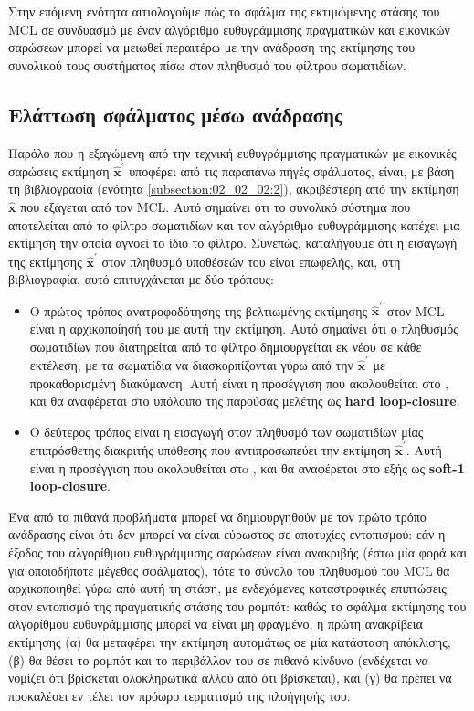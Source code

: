 Στην επόμενη ενότητα αιτιολογούμε πώς το σφάλμα της εκτιμώμενης στάσης
του MCL σε συνδυασμό με έναν αλγόριθμο ευθυγράμμισης πραγματικών και εικονικών
σαρώσεων μπορεί να μειωθεί περαιτέρω με την ανάδραση της εκτίμησης του
συνολικού τους συστήματος πίσω στον πληθυσμό του φίλτρου σωματιδίων.


\subsection{Ελάττωση σφάλματος μέσω ανάδρασης}
\label{subsection:02_02_03:03}

Παρόλο που η εξαγώμενη από την τεχνική ευθυγράμμισης πραγματικών με εικονικές
σαρώσεις εκτίμηση $\hat{\bm{x}}^{\prime}$ υποφέρει από τις παραπάνω πηγές
σφάλματος, είναι, με βάση τη βιβλιογραφία (ενότητα
\ref{subsection:02_02_02:2}), ακριβέστερη από την εκτίμηση
$\bm{\hat{x}}$ που εξάγεται από τον MCL. Αυτό σημαίνει ότι το συνολικό σύστημα
που αποτελείται από το φίλτρο σωματιδίων και τον αλγόριθμο ευθυγράμμισης
κατέχει μια εκτίμηση την οποία αγνοεί το ίδιο το φίλτρο. Συνεπώς, καταλήγουμε
ότι η εισαγωγή της εκτίμησης $\hat{\bm{x}}^{\prime}$ στον πληθυσμό υποθέσεών
του είναι επωφελής, και, στη βιβλιογραφία, αυτό επιτυγχάνεται με δύο τρόπους:

\begin{itemize}
  \item Ο πρώτος τρόπος ανατροφοδότησης της βελτιωμένης εκτίμησης
        $\hat{\bm{x}}^{\prime}$ στον MCL είναι η αρχικοποίησή του με αυτή
        την εκτίμηση. Αυτό σημαίνει ότι ο πληθυσμός σωματιδίων που διατηρείται
        από το φίλτρο δημιουργείται εκ νέου σε κάθε εκτέλεση, με τα σωματίδια
        να διασκορπίζονται γύρω από την $\hat{\bm{x}}^{\prime}$ με
        προκαθορισμένη διακύμανση. Αυτή είναι η προσέγγιση που ακολουθείται στο
        \cite{Vasiljevic2016a}, και θα αναφέρεται στο υπόλοιπο της παρούσας
        μελέτης ως \textbf{hard loop-closure}.
  \item Ο δεύτερος τρόπος είναι η εισαγωγή στον πληθυσμό των σωματιδίων μίας
        επιπρόσθετης διακριτής υπόθεσης που αντιπροσωπεύει την εκτίμηση
        $\hat{\bm{x}}^{\prime}$. Αυτή είναι η προσέγγιση που ακολουθείται στo
        \cite{Peng2018a}, και θα αναφέρεται στο εξής ως
        \textbf{soft-1 loop-closure}.
\end{itemize}

Ένα από τα πιθανά προβλήματα μπορεί να δημιουργηθούν με τον πρώτο τρόπο
ανάδρασης είναι ότι δεν μπορεί να είναι εύρωστος σε αποτυχίες εντοπισμού: εάν η
έξοδος του αλγορίθμου ευθυγράμμισης σαρώσεων είναι ανακριβής (έστω μία φορά και
για οποιοδήποτε μέγεθος σφάλματος), τότε το σύνολο του πληθυσμού του MCL θα
αρχικοποιηθεί γύρω από αυτή τη στάση, με ενδεχόμενες καταστροφικές επιπτώσεις
στον εντοπισμό της πραγματικής στάσης του ρομπότ: καθώς το σφάλμα εκτίμησης του
αλγορίθμου ευθυγράμμισης μπορεί να είναι μη φραγμένο, η πρώτη ανακρίβεια
εκτίμησης (α) θα μεταφέρει την εκτίμηση αυτομάτως σε μία κατάσταση απόκλισης,
(β) θα θέσει το ρομπότ και το περιβάλλον του σε πιθανό κίνδυνο (ενδέχεται
να νομίζει ότι βρίσκεται ολοκληρωτικά αλλού από ότι βρίσκεται), και (γ) θα
πρέπει να προκαλέσει εν τέλει τον πρόωρο τερματισμό της πλοήγησής του.

